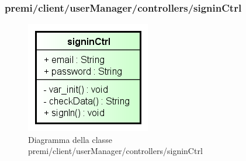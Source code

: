 \subsubsection{premi/client/userManager/controllers/signinCtrl}
\begin{figure}[h]
\begin{center}
\includegraphics[scale=0.55]{img/diacla/signinCtrl.png}
\caption{Diagramma della classe premi/client/userManager/controllers/signinCtrl}
\end{center}
\end{figure}


